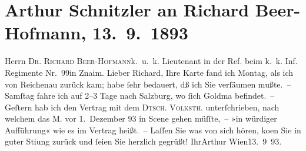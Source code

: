 

         
         \newcommand{\erwaehntePersonen}{Personen: Richard Beer-Hofmann, Paul Goldmann}
         \newcommand{\erwaehnteInstitutionen}{}
         \newcommand{\erwaehnteOrte}{Orte: Reichenau an der Rax, Salzburg, Volkstheater, Wien, Znaim}
         \newcommand{\erwaehnteWerke}{Werke: Das Märchen. Schauspiel in drei Aufzügen}
               \section[Arthur Schnitzler an Richard Beer-Hofmann, 13. 9. 1893]{ Arthur Schnitzler an Richard Beer-Hofmann, 13. 9. 1893}\nopagebreak{}\rehead{ }\begin{ledgroupsized}[t]{13cm}\normalsize\beginnumbering \toendnotes[C]{\smallbreak\pagebreak[2]} 
\pstart{}{\pb}Herrn \textsc{Dr. Richard
                     Beer-Hofmann}\pend{}\pstart{}k. u. k. Lieutenant in der Ref. beim k. k. Inf. Regimente Nr. 99\pend{}\pstart{}in Znaim. \pend{}{\bigskip}\pstart{}{\pb}Lieber Richard,\pend\pstart
           Ihre Karte fand ich Montag, als ich von Reichenau zurück kam; habe ſehr bedauert, dß ich Sie verſäumen mußte. –\pend
           \pstart
           Samſtag fahre ich auf 2–3 Tage nach Salzburg, wo ſich
                  Goldma{\geminationn} be{\pb}findet. –\pend
           \pstart
           Geſtern hab ich den Vertrag mit dem \textsc{Dtsch. Volksth}. unterſchrieben, nach welchem das
                  M. vor 1. Dezember 93 in Scene
               gehen müſſte, – »in würdiger Aufführung« wie es im Vertrag heißt. –\pend
           \pstart
           {\pb}Laſſen Sie was von sich hören, ko{\geminationm}en Sie in guter Sti{\geminationm}ung
               zurück und ſeien Sie herzlich gegrüßt!\pend
           \pstart Ihr\spacefill\mbox{Arthur}\pend{}\pstart
           Wien13. 9 93.\pend
           

\end{ledgroupsized}
